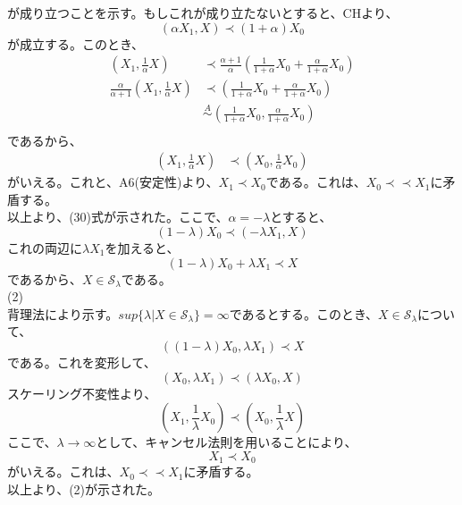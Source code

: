 \documentclass[a4paper,11pt]{jsarticle}
\numberwithin{equation}{section}
\begin{document}
が成り立つことを示す。もしこれが成り立たないとすると、CHより、
\begin{equation}
    (\alpha X_1,X) \prec (1+\alpha)X_0
\end{equation}
が成立する。このとき、
\begin{align}
    (X_1,\frac{1}{\alpha}X) &\prec \frac{\alpha+1}{\alpha}(\frac{1}{1+\alpha}X_0+\frac{\alpha}{1+\alpha}X_0)\\
    \frac{\alpha}{\alpha+1}(X_1,\frac{1}{\alpha}X) &\prec (\frac{1}{1+\alpha}X_0+\frac{\alpha}{1+\alpha}X_0)\\
    &\overset{A}{\sim} (\frac{1}{1+\alpha}X_0,\frac{\alpha}{1+\alpha}X_0)\\
\end{align}
であるから、
\begin{align}
    (X_1,\frac{1}{\alpha}X) &\prec (X_0,\frac{1}{\alpha}X_0)
\end{align}
がいえる。これと、A6(安定性)より、$X_1 \prec X_0$である。これは、$X_0 \prec \prec X_1$に矛盾する。\\
以上より、(30)式が示された。ここで、$\alpha = -\lambda$とすると、
\begin{equation}
    (1-\lambda)X_0 \prec (-\lambda X_1,X)
\end{equation}
これの両辺に$\lambda X_1$を加えると、
\begin{equation}
    (1-\lambda)X_0 + \lambda X_1 \prec X
\end{equation}
であるから、$X \in \mathcal{S}_{\lambda}$である。\\
(2)\\
背理法により示す。$sup\{\lambda|X \in \mathcal{S}_{\lambda}\}=\infty$であるとする。このとき、$X\in \mathcal{S}_{\lambda}$について、
\begin{equation}
    ((1-\lambda)X_0,\lambda X_1) \prec X
\end{equation}
である。これを変形して、
\begin{equation}
    (X_0,\lambda X_1) \prec (\lambda X_0,X)
\end{equation}
スケーリング不変性より、
\begin{equation}
    (X_1,\frac{1}{\lambda}X_0) \prec (X_0,\frac{1}{\lambda}X)
\end{equation}  
ここで、$\lambda \rightarrow \infty$として、キャンセル法則を用いることにより、
\begin{equation}
    X_1 \prec X_0
\end{equation}
がいえる。これは、$X_0 \prec \prec X_1$に矛盾する。\\
以上より、(2)が示された。\hfill\qedsymbol\\
\end{document}
